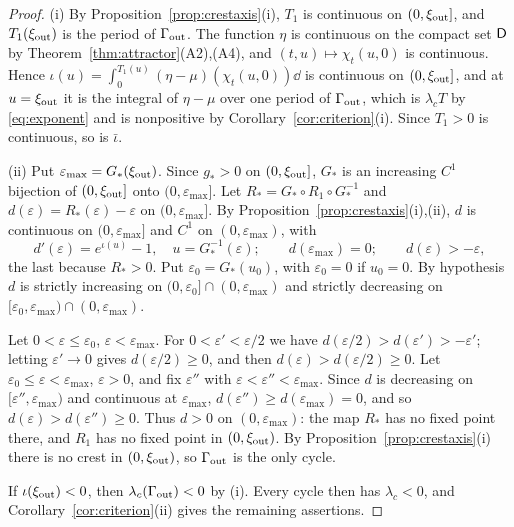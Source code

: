 \begin{proof}
(i) By Proposition~\ref{prop:crestaxis}(i), $T_1$ is continuous on $(0,\xi_{\rm out}]$, and $T_1(\xi_{\rm out})$ is the period of $\Gamma_{\rm out}$. The function $\eta$ is continuous on the compact set $\mathsf D$ by Theorem~\ref{thm:attractor}(A2),(A4), and $(t,u)\mapsto\chi_t(u,0)$ is continuous. Hence $\iota(u)=\int_0^{T_1(u)}(\eta-\mu)(\chi_t(u,0))\dd$ is continuous on $(0,\xi_{\rm out}]$, and at $u=\xi_{\rm out}$ it is the integral of $\eta-\mu$ over one period of $\Gamma_{\rm out}$, which is $\lambda_cT$ by \eqref{eq:exponent} and is nonpositive by Corollary~\ref{cor:criterion}(i). Since $T_1>0$ is continuous, so is $\bar\iota$.

(ii) Put $\varepsilon_{\max}=G_\ast(\xi_{\rm out})$. Since $g_\ast>0$ on $(0,\xi_{\rm out}]$, $G_\ast$ is an increasing $C^1$ bijection of $(0,\xi_{\rm out}]$ onto $(0,\varepsilon_{\max}]$. Let $R_\ast=G_\ast\circ R_1\circ G_\ast^{-1}$ and $d(\varepsilon)=R_\ast(\varepsilon)-\varepsilon$ on $(0,\varepsilon_{\max}]$. By Proposition~\ref{prop:crestaxis}(i),(ii), $d$ is continuous on $(0,\varepsilon_{\max}]$ and $C^1$ on $(0,\varepsilon_{\max})$, with
\[
d'(\varepsilon)=e^{\iota(u)}-1,\quad u=G_\ast^{-1}(\varepsilon);\qquad d(\varepsilon_{\max})=0;\qquad d(\varepsilon)>-\varepsilon ,
\]
the last because $R_\ast>0$. Put $\varepsilon_0=G_\ast(u_0)$, with $\varepsilon_0=0$ if $u_0=0$. By hypothesis $d$ is strictly increasing on $(0,\varepsilon_0]\cap(0,\varepsilon_{\max})$ and strictly decreasing on $[\varepsilon_0,\varepsilon_{\max})\cap(0,\varepsilon_{\max})$.

Let $0<\varepsilon\le\varepsilon_0$, $\varepsilon<\varepsilon_{\max}$. For $0<\varepsilon'<\varepsilon/2$ we have $d(\varepsilon/2)>d(\varepsilon')>-\varepsilon'$; letting $\varepsilon'\to0$ gives $d(\varepsilon/2)\ge0$, and then $d(\varepsilon)>d(\varepsilon/2)\ge0$. Let $\varepsilon_0\le\varepsilon<\varepsilon_{\max}$, $\varepsilon>0$, and fix $\varepsilon''$ with $\varepsilon<\varepsilon''<\varepsilon_{\max}$. Since $d$ is decreasing on $[\varepsilon'',\varepsilon_{\max})$ and continuous at $\varepsilon_{\max}$, $d(\varepsilon'')\ge d(\varepsilon_{\max})=0$, and so $d(\varepsilon)>d(\varepsilon'')\ge0$. Thus $d>0$ on $(0,\varepsilon_{\max})$: the map $R_\ast$ has no fixed point there, and $R_1$ has no fixed point in $(0,\xi_{\rm out})$. By Proposition~\ref{prop:crestaxis}(i) there is no crest in $(0,\xi_{\rm out})$, so $\Gamma_{\rm out}$ is the only cycle.

If $\iota(\xi_{\rm out})<0$, then $\lambda_c(\Gamma_{\rm out})<0$ by (i). Every cycle then has $\lambda_c<0$, and Corollary~\ref{cor:criterion}(ii) gives the remaining assertions.


\end{proof}
